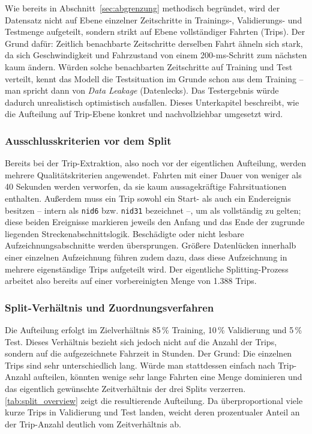Wie bereits in Abschnitt~\ref{sec:abgrenzung} methodisch begründet, wird der Datensatz nicht auf Ebene einzelner Zeitschritte in Trainings-, Validierungs- und Testmenge aufgeteilt, sondern strikt auf Ebene vollständiger Fahrten (Trips). Der Grund dafür: Zeitlich benachbarte Zeitschritte derselben Fahrt ähneln sich stark, da sich Geschwindigkeit und Fahrzustand von einem 200-ms-Schritt zum nächsten kaum ändern. Würden solche benachbarten Zeitschritte auf Training und Test verteilt, kennt das Modell die Testsituation im Grunde schon aus dem Training -- man spricht dann von \emph{Data Leakage} (Datenlecks). Das Testergebnis würde dadurch unrealistisch optimistisch ausfallen. Dieses Unterkapitel beschreibt, wie die Aufteilung auf Trip-Ebene konkret und nachvollziehbar umgesetzt wird.

\subsubsection{Ausschlusskriterien vor dem Split}

Bereits bei der Trip-Extraktion, also noch vor der eigentlichen Aufteilung, werden mehrere Qualitätskriterien angewendet. Fahrten mit einer Dauer von weniger als 40 Sekunden werden verworfen, da sie kaum aussagekräftige Fahrsituationen enthalten. Außerdem muss ein Trip sowohl ein Start- als auch ein Endereignis besitzen -- intern als \texttt{nid6} bzw. \texttt{nid31} bezeichnet --, um als vollständig zu gelten; diese beiden Ereignisse markieren jeweils den Anfang und das Ende der zugrunde liegenden Streckenabschnittslogik. Beschädigte oder nicht lesbare Aufzeichnungsabschnitte werden übersprungen. Größere Datenlücken innerhalb einer einzelnen Aufzeichnung führen zudem dazu, dass diese Aufzeichnung in mehrere eigenständige Trips aufgeteilt wird. Der eigentliche Splitting-Prozess arbeitet also bereits auf einer vorbereinigten Menge von 1{.}388 Trips.

\subsubsection{Split-Verhältnis und Zuordnungsverfahren}

Die Aufteilung erfolgt im Zielverhältnis 85\,\% Training, 10\,\% Validierung und 5\,\% Test. Dieses Verhältnis bezieht sich jedoch nicht auf die Anzahl der Trips, sondern auf die aufgezeichnete Fahrzeit in Stunden. Der Grund: Die einzelnen Trips sind sehr unterschiedlich lang. Würde man stattdessen einfach nach Trip-Anzahl aufteilen, könnten wenige sehr lange Fahrten eine Menge dominieren und das eigentlich gewünschte Zeitverhältnis der drei Splits verzerren. \autoref{tab:split_overview} zeigt die resultierende Aufteilung. Da überproportional viele kurze Trips in Validierung und Test landen, weicht deren prozentualer Anteil an der Trip-Anzahl deutlich vom Zeitverhältnis ab.


